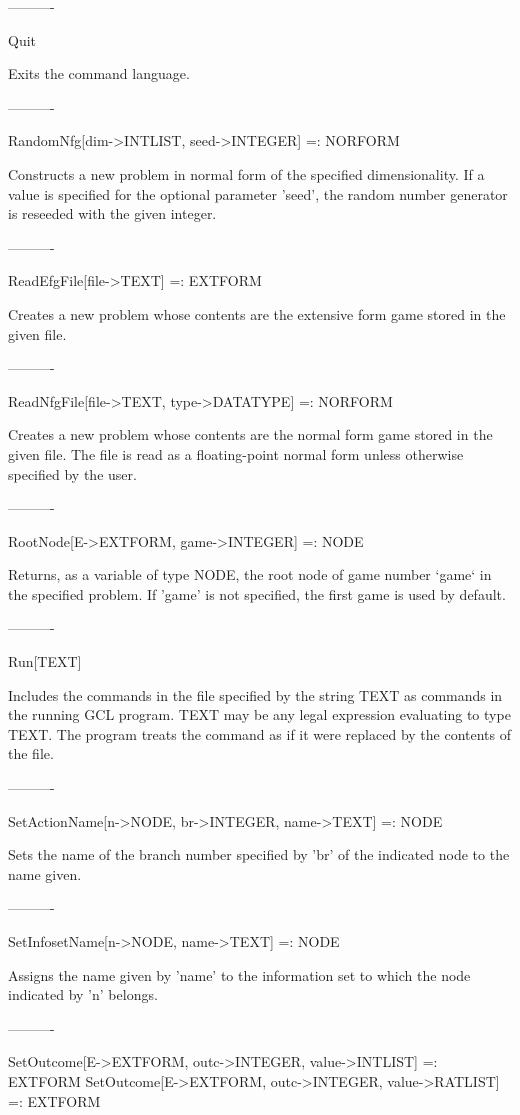----------

Quit

	Exits the command language.

----------

RandomNfg[dim->INTLIST, {seed->INTEGER}] =: NORFORM

	Constructs a new problem in normal form of the specified
dimensionality.  If a value is specified for the optional parameter 'seed',
the random number generator is reseeded with the given integer.

----------

ReadEfgFile[file->TEXT] =: EXTFORM

	Creates a new problem whose contents are the extensive form game
stored in the given file.

----------

ReadNfgFile[file->TEXT, {type->DATATYPE}] =: NORFORM

	Creates a new problem whose contents are the normal form game stored
in the given file.  The file is read as a floating-point normal form unless
otherwise specified by the user.

----------

RootNode[E->EXTFORM, {game->INTEGER}] =: NODE

	Returns, as a variable of type NODE, the root node of game number 
`game` in the specified problem.  If 'game' is not specified, the first game is
used by default.

----------

Run[TEXT]

	Includes the commands in the file specified by the string TEXT as
commands in the running GCL program.  TEXT may be any legal expression
evaluating to type TEXT.  The program treats the command as if it were
replaced by the contents of the file.

----------

SetActionName[n->NODE, br->INTEGER, name->TEXT] =: NODE

	Sets the name of the branch number specified by 'br' of the indicated 
node to the name given.

----------

SetInfosetName[n->NODE, name->TEXT] =: NODE

	Assigns the name given by 'name' to the information set to which the 
node indicated by 'n' belongs.

----------

SetOutcome[E->EXTFORM, outc->INTEGER, value->INTLIST] =: EXTFORM
SetOutcome[E->EXTFORM, outc->INTEGER, value->RATLIST] =: EXTFORM

